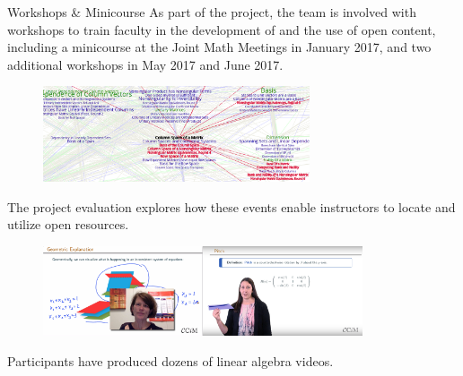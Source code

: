 \begin{sectionblock}{Workshops \& Minicourse}
  As part of the project, the team is involved with workshops to train
  faculty in the development of and the use of open content, including
  a minicourse at the Joint Math Meetings in January 2017, and two
  additional workshops in May 2017 and June 2017.\\[1ex]

    \begin{figure}
      \includegraphics[width=0.70\textwidth]{topics.png}
    \end{figure}

  The project evaluation explores how these events enable instructors
  to locate and utilize open resources.

  \begin{figure}\null\hfill\includegraphics[width=0.42\textwidth]{petra.png}\hfill\includegraphics[width=0.42\textwidth]{sarah.png}\hfill\null\end{figure}
  Participants have produced
  dozens of linear algebra videos.

\end{sectionblock}



\vfill

